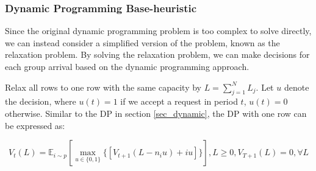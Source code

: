 
\subsubsection{Dynamic Programming Base-heuristic}
Since the original dynamic programming problem is too complex to solve directly, we can instead consider a simplified version of the problem, known as the relaxation problem. By solving the relaxation problem, we can make decisions for each group arrival based on the dynamic programming approach.


Relax all rows to one row with the same capacity by $L = \sum_{j=1}^{N} L_j$. Let $u$ denote the decision, where $u(t) = 1$ if we accept a request in period $t$, $u(t) =0$ otherwise. Similar to the DP in section \ref{sec_dynamic}, the DP with one row can be expressed as:

$$V_{t}(L) = \mathbb{E}_{i \sim p} [\max_{u \in \{0,1\}} \{ {[V_{t+1}(L-n_i u)+ i u]}\}], L \geq 0, V_{T+1}(L) =0, \forall L$$

